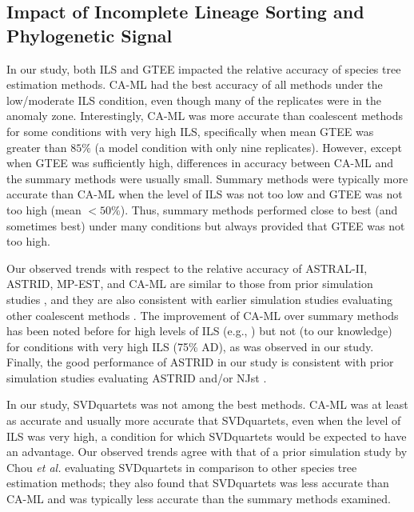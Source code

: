 \subsection{Impact of Incomplete Lineage Sorting and Phylogenetic Signal}
In our study, both ILS and GTEE impacted the relative accuracy of species tree estimation methods. 
CA-ML had the best accuracy of all methods under the low/moderate ILS condition, even though many of the replicates were in the anomaly zone. 
Interestingly, CA-ML was more accurate than coalescent methods for some conditions with very high ILS, specifically when mean GTEE was greater than $85\%$ (a model condition with only nine replicates). 
However, except when GTEE was sufficiently high, differences in accuracy between CA-ML and the summary methods were usually small.
Summary methods were typically more accurate than CA-ML when the level of ILS was not too low and GTEE was not too high (mean $<50\%$). 
Thus, summary methods performed close to best (and sometimes best) under many conditions but always provided that GTEE was not too high.

Our observed trends with respect to the relative accuracy of ASTRAL-II, ASTRID, MP-EST, and CA-ML are similar to those from prior simulation studies   \cite{mirarab2014statistical-binning,mirarab2014astral,vachaspati2015astrid,bayzid2015weighted,chou2015comparative, davidson2015phylogenomic, mirarab2016evaluating}, and they are also consistent with earlier simulation studies evaluating other coalescent methods \cite{leache2010accuracy,liu2011estimating-njst,bayzid2013naive,patel2013error, liu2015coalescent}. 
The improvement of CA-ML over summary methods has been noted before for high levels of ILS (e.g., \cite{mirarab2015astral2}) but not (to our knowledge) for conditions with very high ILS (75\% AD), as was observed in our study. 
Finally, the good performance of ASTRID in our study is consistent with prior simulation studies evaluating ASTRID and/or \gls{NJst} \cite{liu2015coalescent,vachaspati2015astrid}.

In our study, SVDquartets was not among the best methods.
CA-ML was at least as accurate and usually more accurate that SVDquartets, even when the level of ILS was very high, a condition for which SVDquartets would be expected to have an advantage.
Our observed trends agree with that of a prior simulation study \cite{chou2015comparative} by Chou {\em et al.} evaluating SVDquartets in comparison to other species tree estimation methods; they also found that SVDquartets was less accurate than CA-ML and was typically less accurate than the summary methods examined. 

